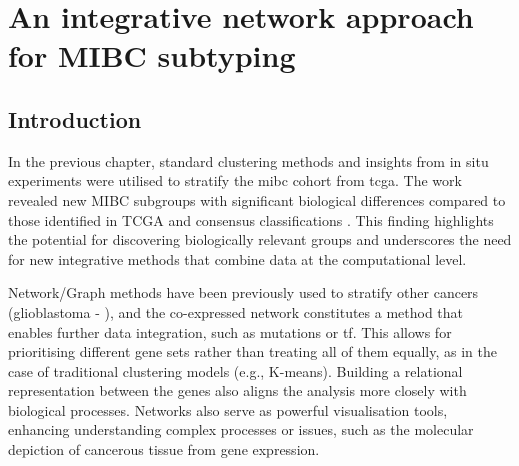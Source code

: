 \chapter{An integrative network approach for MIBC subtyping} \label{s:N_I}


\vspace{3mm}
\vspace{3mm}


\section{Introduction}

In the previous chapter, standard clustering methods and insights from in situ experiments \citep{Baker2022-bj} were utilised to stratify the \acrfull{mibc} cohort from \acrfull{tcga}. The work revealed new MIBC subgroups with significant biological differences compared to those identified in TCGA and consensus classifications \citep{Robertson2017-mg,Kamoun2020-tj}. This finding highlights the potential for discovering biologically relevant groups and underscores the need for new integrative methods that combine data at the computational level.

Network/Graph methods have been previously used to stratify other cancers (glioblastoma - \citet{Care2019-ij}), and the co-expressed network constitutes a method that enables further data integration, such as mutations or \acrfull{tf}. This allows for prioritising different gene sets rather than treating all of them equally, as in the case of traditional clustering models (e.g., K-means). Building a relational representation between the genes also aligns the analysis more closely with biological processes. Networks also serve as powerful visualisation tools, enhancing understanding complex processes or issues, such as the molecular depiction of cancerous tissue from gene expression.

